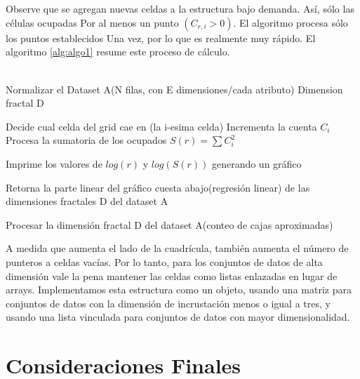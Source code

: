 \\\\
Observe que se agregan nuevas celdas a la estructura bajo demanda. Así, sólo las células ocupadas
Por al menos un punto $(C_{r,i}> 0)$. El algoritmo procesa sólo los puntos establecidos
Una vez, por lo que es realmente muy rápido. El algoritmo \ref{alg:algo1} resume este proceso de cálculo.
\\\\
\begin{algorithm}
\begin{algorithmic}[1]
\REQUIRE Normalizar el Dataset A(N filas, con E dimensiones/cada atributo)
\label{lin:lineaRara}
\ENSURE  Dimension fractal D

    \STATE Decide cual celda del grid cae en (la i-esima celda)
    \STATE Incrementa la cuenta $C_i$
    \ENDFOR
    \STATE Procesa la sumatoria de los ocupados $S(r) = \sum C_i^2$
\ENDFOR

\STATE Imprime los valores de $log(r)$ y $log(S(r))$ generando un gráfico

\STATE Retorna la parte linear del gráfico cuesta abajo(regresión linear) de las dimensiones fractales D del dataset A

\end{algorithmic}
\caption{Procesar la dimensión fractal D del dataset A(conteo de cajas aproximadas)}
\label{alg:algo1}
\end{algorithm}
 
A medida que aumenta el lado de la cuadrícula, también aumenta el número de punteros a celdas vacías. Por lo tanto, para los conjuntos de datos de alta dimensión vale la pena mantener las celdas como listas enlazadas en lugar de arrays. Implementamos esta estructura como un objeto, usando una matriz para conjuntos de datos con la dimensión de incrustación menos o igual a tres, y usando una lista vinculada para conjuntos de datos con mayor dimensionalidad.	


\section{Consideraciones Finales}

